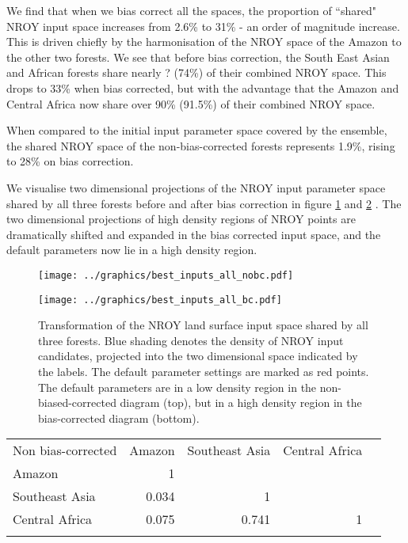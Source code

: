 \documentclass[gmd, manuscript]{copernicus}
\begin{document}
We find that when we bias correct all the spaces, the proportion of ``shared" NROY input space increases from 2.6\% to 31\% - an order of magnitude increase. This is driven chiefly by the harmonisation of the NROY space of the Amazon to the other two forests. We see that before bias correction, the South East Asian and African forests share nearly ? (74\%) of their combined NROY space. This drops to 33\% when bias corrected, but with the advantage that the Amazon and Central Africa now share over 90\% (91.5\%) of their combined NROY space. 

When compared to the initial input parameter space covered by the ensemble, the shared NROY space of the non-bias-corrected forests represents 1.9\%, rising to 28\% on bias correction.

We visualise two dimensional projections of the NROY input parameter space shared by all three forests before and after bias correction in figure \ref{fig:best_inputs_all_nobc} and \ref{fig:best_inputs_all_bc} . The two dimensional projections of high density regions of NROY points are dramatically shifted and expanded in the bias corrected input space, and the default parameters now lie in a high density region.

\begin{figure}[t]
\texttt{[image: ../graphics/best\_inputs\_all\_nobc.pdf]}
\caption{
}
\label{fig:best_inputs_all_nobc}
\end{figure}


\begin{figure}[t]
\texttt{[image: ../graphics/best\_inputs\_all\_bc.pdf]}
\caption{Transformation of the NROY land surface input space shared by all three forests. Blue shading denotes the density of NROY input candidates, projected into the two dimensional space indicated by the labels. The default parameter settings are marked as red points. The default parameters are in a low density region in the non-biased-corrected diagram (top), but in a high density region in the bias-corrected diagram (bottom).
}
\label{fig:best_inputs_all_bc}
\end{figure}


\begin{table*}[t]
\caption{.}
\begin{tabular}{lrrrr}
\tophline

Non bias-corrected      & Amazon & Southeast Asia & Central Africa  \\
\middlehline
Amazon                &          1        &             &     \\
Southeast Asia      &        0.034  &           1   &    \\
Central Africa         &    0.075 &  0.741  &   1 \\
\bottomhline
\end{tabular}
\belowtable{} %
\label{tab:}
\end{table*}
\end{document}
